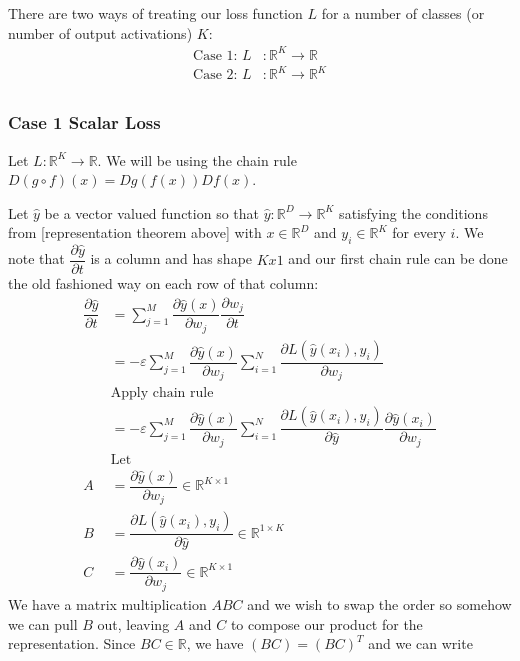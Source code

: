 There are two ways of treating our loss function $L$ for a number of classes (or number of output activations) $K$:
\begin{align}
    \text{Case 1: } L &: \mathbb{R}^K \to \mathbb{R}\\
    \text{Case 2: } L &: \mathbb{R}^K \to \mathbb{R}^K\\
\end{align}

\subsubsection{Case 1 Scalar Loss}

Let $L : \mathbb{R}^K \to \mathbb{R}$. We will be using the chain rule $D (g \circ f) (x) = Dg(f(x))Df(x)$. 

Let $\hat y$ be a vector valued function so that $\hat y : \mathbb{R}^D \to \mathbb{R}^K$  satisfying the conditions from [representation theorem above] with $x \in \mathbb{R}^D$ and $y_i \in \mathbb{R}^K$ for every $i$. We note that $\dfrac{\partial \hat y}{\partial t}$ is a column and has shape $Kx1$ and our first chain rule can be done the old fashioned way on each row of that column:
\begin{align}
    \dfrac{\partial \hat y}{\partial t} &= \sum_{j=1}^M \dfrac{\partial \hat y(x)}{\partial w_j} \dfrac{\partial w_j}{\partial t}\\
    &= -\varepsilon \sum_{j=1}^M \dfrac{\partial \hat y(x)}{\partial w_j} \sum_{i=1}^N \dfrac{\partial L(\hat y(x_i), y_i)}{\partial w_j}\\
    &\text{Apply chain rule}\\
    &= -\varepsilon \sum_{j=1}^M \dfrac{\partial \hat y(x)}{\partial w_j} \sum_{i=1}^N \dfrac{\partial L(\hat y(x_i), y_i)}{\partial \hat y}\dfrac{\partial \hat y(x_i)}{\partial w_j}\\
    &\text{Let}\\
    A &= \dfrac{\partial \hat y(x)}{\partial w_j} \in \mathbb{R}^{K \times 1}\\
    B &= \dfrac{\partial L(\hat y(x_i), y_i)}{\partial \hat y} \in \mathbb{R}^{1 \times K}\\
    C &= \dfrac{\partial \hat y(x_i)}{\partial w_j} \in \mathbb{R}^{K \times 1}
\end{align}
We have a matrix multiplication $ABC$ and we wish to swap the order so somehow we can pull $B$ out, leaving $A$ and $C$ to compose our product for the representation. Since $BC \in \mathbb{R}$, we have $(BC) = (BC)^T$ and we can write

